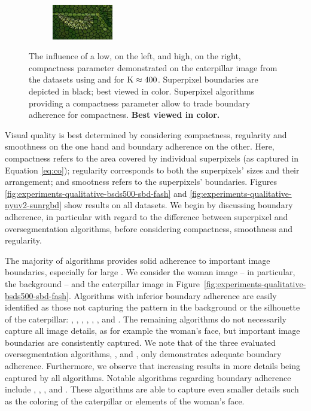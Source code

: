 \begin{figure}
\begin{subfigure}[b]{0.141\textwidth}
	\end{subfigure}
	\begin{subfigure}[b]{0.141\textwidth}
		\includegraphics[height=1.525cm]{pictures/compactness/bsds500/crs/score/0.1/cropped/crs_35028_contours}
	\end{subfigure}
	\caption{The influence of a low, on the left, and high, on the right, compactness parameter
	demonstrated on the caterpillar image from the \BSDS datasets using \SLIC and \CRS
	for $\text{K} \approx 400$. Superpixel boundaries are depicted in black; best viewed in color.
	Superpixel algorithms providing a compactness parameter allow to trade boundary
	adherence for compactness.
	\textbf{Best viewed in color.}}
	\label{fig:experiments-qualitative-bsds500-compactness}
\end{figure}

Visual quality is best determined by considering compactness, regularity and smoothness
on the one hand and boundary adherence on the other. Here, compactness refers to
the area covered by individual superpixels (as captured in Equation \eqref{eq:co});
regularity corresponds to both the superpixels' sizes and their arrangement;
and smootness refers to the superpixels' boundaries.
Figures \ref{fig:experiments-qualitative-bsds500-sbd-fash}
and \ref{fig:experiments-qualitative-nyuv2-sunrgbd} show results on all datasets.
We begin by discussing boundary adherence, in particular with regard to the difference
between superpixel and oversegmentation algorithms, before considering compactness,
smoothness and regularity.

The majority of algorithms provides solid adherence to important image boundaries, especially for large \K.
We consider the woman image -- in particular, the background --
and the caterpillar image in Figure~\ref{fig:experiments-qualitative-bsds500-sbd-fash}.
Algorithms with inferior boundary adherence are easily identified as those not capturing
the pattern in the background or the silhouette of the caterpillar:
\FH, \QS, \CIS, \PF, \PB, \TPS, \TP and \SEAW.
The remaining algorithms do not necessarily
capture all image details, as for example the woman's face, but important image boundaries
are consistently captured. 
We note that of the three evaluated oversegmentation algorithms, \ie \EAMS, \FH and \QS,
only \EAMS demonstrates adequate boundary adherence.
Furthermore, we observe that increasing \K results in more details
being captured by all algorithms. Notable algorithms regarding boundary adherence include \CRS, \ERS, \SEEDS, \ERGC and \ETPS.
These algorithms are able to capture even smaller details such as the coloring of the caterpillar or
elements of the woman's face.

